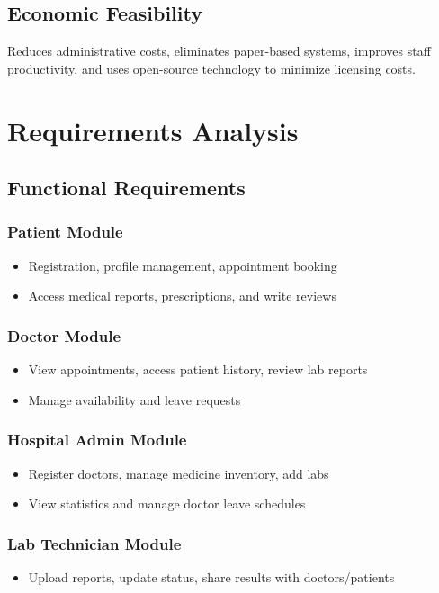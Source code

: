 \subsection{Economic Feasibility}
Reduces administrative costs, eliminates paper-based systems, improves staff productivity, and uses open-source technology to minimize licensing costs.

\section{Requirements Analysis}

\subsection{Functional Requirements}

\subsubsection{Patient Module}
\begin{itemize}
    \item Registration, profile management, appointment booking
    \item Access medical reports, prescriptions, and write reviews
\end{itemize}

\subsubsection{Doctor Module}
\begin{itemize}
    \item View appointments, access patient history, review lab reports
    \item Manage availability and leave requests
\end{itemize}

\subsubsection{Hospital Admin Module}
\begin{itemize}
    \item Register doctors, manage medicine inventory, add labs
    \item View statistics and manage doctor leave schedules
\end{itemize}

\subsubsection{Lab Technician Module}
\begin{itemize}
    \item Upload reports, update status, share results with doctors/patients
\end{itemize}

